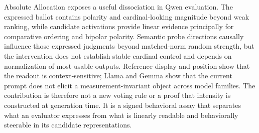 \documentclass[11pt]{article}
\begin{document}
Absolute Allocation exposes a useful dissociation in Qwen evaluation. The
expressed ballot contains polarity and cardinal-looking magnitude beyond weak
ranking, while candidate activations provide linear evidence principally for
comparative ordering and bipolar polarity. Semantic probe directions causally
influence those expressed judgments beyond matched-norm random strength, but
the intervention does not establish stable cardinal control and depends on
normalization of most usable outputs. Reference display and position show that
the readout is context-sensitive; Llama and Gemma show that the current prompt
does not elicit a measurement-invariant object across model families. The
contribution is therefore not a new voting rule or a proof that intensity is
constructed at generation time. It is a signed behavioral assay that separates
what an evaluator expresses from what is linearly readable and behaviorally
steerable in its candidate representations.



\end{document}
